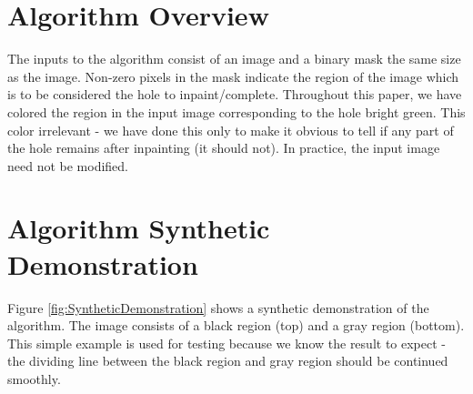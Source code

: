 \documentclass{InsightArticle}
\begin{document}
\section{Algorithm Overview}
The inputs to the algorithm consist of an image and a binary mask the same size as the image. Non-zero pixels in the mask indicate the region of the image which is to be considered the hole to inpaint/complete. Throughout this paper, we have colored the region in the input image corresponding to the hole bright green. This color irrelevant - we have done this only to make it obvious to tell if any part of the hole remains after inpainting (it should not). In practice, the input image need not be modified.

\section{Algorithm Synthetic Demonstration}
Figure \ref{fig:SyntheticDemonstration} shows a synthetic demonstration of the algorithm. The image consists of a black region (top) and a gray region (bottom).  This simple example is used for testing because we know the result to expect - the dividing line between the black region and gray region should be continued smoothly.
\end{document}

